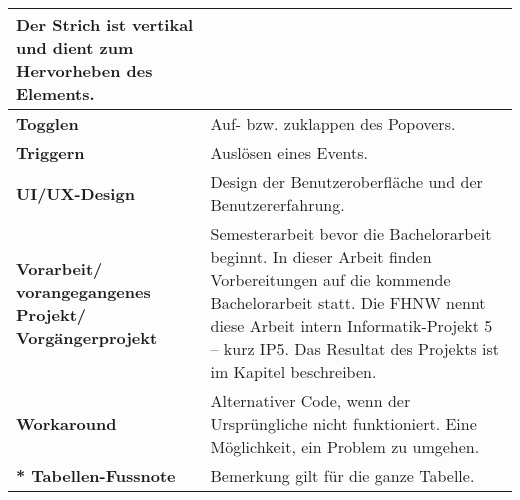 \begin{table}[!ht]
\begin{adjustbox}{max width=\textwidth}
\begin{tabular}{ p{\glossarywithTitle} | p{\glossarywith} }
                Der Strich ist vertikal und dient zum Hervorheben des Elements. \\
            \hline
            \bf{Togglen} & Auf- bzw. zuklappen des Popovers. \\
            \hline
            \bf{Triggern} & Auslösen eines Events. \\
            \hline
            \bf{UI/UX-Design} & Design der Benutzeroberfläche und der Benutzererfahrung. \\
            \hline
            \raggedright \bf{Vorarbeit/ vorangegangenes Projekt/ Vorgängerprojekt} & 
                Semesterarbeit bevor die Bachelorarbeit beginnt. 
                In dieser Arbeit finden Vorbereitungen auf die kommende Bachelorarbeit statt. 
                Die FHNW nennt diese Arbeit intern Informatik-Projekt 5 – kurz IP5. 
                Das Resultat des Projekts ist im Kapitel \nameref{sec:countryChoice} beschreiben. \\
            \hline
            \bf{Workaround} & 
                Alternativer Code, wenn der Ursprüngliche nicht funktioniert. 
                Eine Möglichkeit, ein Problem zu umgehen. \\
            \hline
            \hline
            \raggedright \bf{* Tabellen-Fussnote} & Bemerkung gilt für die ganze Tabelle. \\
            \hline
        \end{tabular}
    \end{adjustbox}
\end{table}
